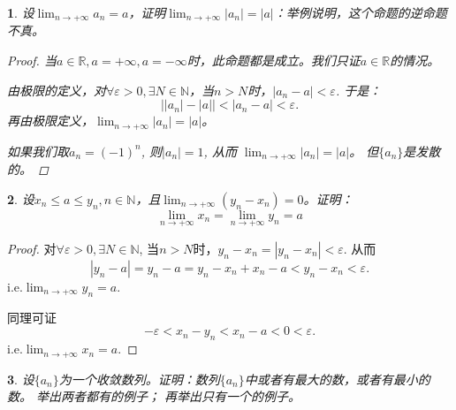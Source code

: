 \documentclass[utf8]{book}
\newtheorem{example}{}[section]             %
\begin{document}
\begin{example}
设$\displaystyle \lim_{n\to +\infty}a_n = a$，证明$\displaystyle \lim_{n\to +\infty}\left |a_n\right | = \left |a\right |$：举例说明，这个命题的逆命题不真。
\begin{proof}当$a\in\mathbb{R}, a=+\infty, a=-\infty$时，此命题都是成立。我们只证$a\in\mathbb{R}$的情况。

由极限的定义，对$\forall \varepsilon > 0, \exists N \in \mathbb{N}$，当$n > N$时，$\left|a_n - a\right| < \varepsilon$. 于是：
$$\left| \left|a_n \right| - \left|a\right| \right | < \left|a_n - a\right| < \varepsilon.$$
再由极限定义，$\displaystyle\lim_{n\to +\infty}\left |a_n\right | = \left |a\right |$。

如果我们取$a_n = (-1)^n$, 则$\left | a_n\right | = 1$, 从而 $\displaystyle \lim_{n\to +\infty}\left |a_n\right | = \left |a\right |$。 但$\{a_n\}$是发散的。
\end{proof}
\end{example}
\begin{example}
设$x_n \leq a \leq y_n, n \in \mathbb{N}$，且$\displaystyle \lim_{n\to +\infty}(y_n-x_n) = 0$。证明：
$$\displaystyle \lim_{n\to +\infty}x_n = \lim_{n\to +\infty}y_n = a$$
\end{example}
\begin{proof}
对$\forall \varepsilon > 0, \exists N \in \mathbb{N}$, 当$n> N$时，$y_n-x_n = \left|y_n - x_n\right| < \varepsilon$. 从而
$$\left| y_n - a\right| = y_n - a = y_n - x_n + x_n - a < y_n - x_n < \varepsilon.$$
i.e.$\displaystyle \lim_{n\to +\infty}y_n = a.$

同理可证
$$-\varepsilon < x_n - y_n < x_n - a < 0 < \varepsilon.$$ i.e.$\displaystyle \lim_{n\to +\infty}x_n = a.$
\end{proof}
\begin{example}
设$\{a_n\}$为一个收敛数列。证明：数列$\{a_n\}$中或者有最大的数，或者有最小的数。 举出两者都有的例子； 再举出只有一个的例子。
\end{example}
\end{document}
